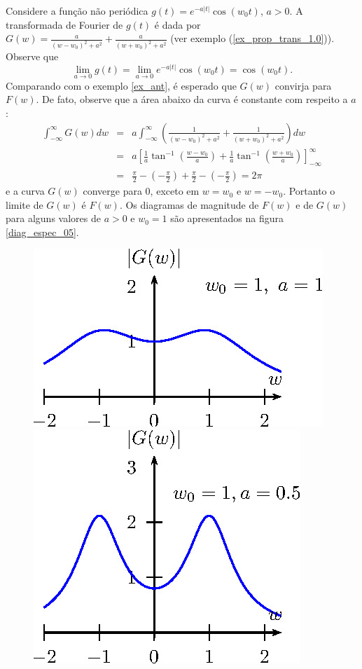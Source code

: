 \begin{ex} Considere a função não periódica $g(t)=e^{-a|t|}\cos(w_0 t)$, $a>0$. A transformada de Fourier de $g(t)$ é dada por $G(w)=\frac{a}{(w-w_0)^2+a^2}+\frac{a}{(w+w_0)^2+a^2}$ (ver exemplo (\ref{ex_prop_trans_1.0})). Observe que 
\begin{equation}
\lim_{a\to 0}g(t)=\lim_{a\to 0} e^{-a|t|}\cos(w_0 t)=\cos(w_0 t).
\end{equation}
Comparando com o exemplo \ref{ex_ant}, é esperado que $G(w)$ convirja para $F(w)$. De fato, observe que a área abaixo da curva é constante com respeito a $a$:
\begin{eqnarray*}
\int_{-\infty}^\infty G(w)dw&=&a\int_{-\infty}^\infty \left(\frac{1}{(w-w_0)^2+a^2}+\frac{1}{(w+w_0)^2+a^2}\right)dw\\
&=&a\left[\frac{1}{a}\tan^{-1}\left(\frac{w-w_0}{a}\right)+\frac{1}{a}\tan^{-1}\left(\frac{w+w_0}{a}\right)\right]_{-\infty}^\infty\\
&=&\frac{\pi}{2}-\left(-\frac{\pi}{2}\right)+\frac{\pi}{2}-\left(-\frac{\pi}{2}\right)=2\pi
\end{eqnarray*}
e a curva $G(w)$ converge para 0, exceto em $w=w_0$ e $w=-w_0$. Portanto o limite de $G(w)$ é $F(w)$. Os diagramas de magnitude de $F(w)$ e de $G(w)$ para alguns valores de $a>0$ e $w_0=1$ são apresentados na figura \ref{diag_espec_05}.
\begin{figure}[!ht] 
\begin{center}
\includegraphics[width=.48\textwidth]{cap_propriedades_transformada/pics/figura_4}
\includegraphics[width=.48\textwidth]{cap_propriedades_transformada/pics/figura_5}\vspace{30pt}

\end{center}
\end{figure}
\end{ex}
